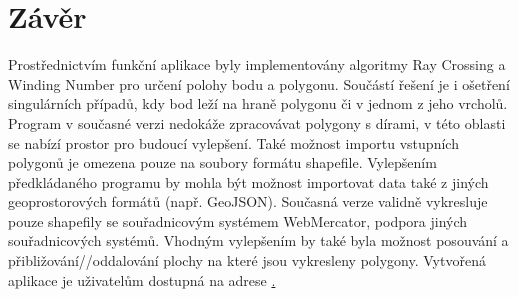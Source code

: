 \documentclass[a4paper,12pt]{article}
\begin{document}
\section{Závěr}
Prostřednictvím funkční aplikace byly implementovány algoritmy Ray Crossing a Winding Number pro určení polohy bodu a polygonu. Součástí řešení je i ošetření singulárních případů, kdy bod leží na hraně polygonu či v jednom z jeho vrcholů.
Program v současné verzi nedokáže zpracovávat polygony s dírami, v této oblasti se nabízí prostor pro budoucí vylepšení. Také možnost importu vstupních polygonů je omezena pouze na soubory formátu shapefile. Vylepšením předkládaného programu by mohla být možnost importovat data  také z jiných geoprostorových formátů (např. GeoJSON). Současná verze validně vykresluje pouze shapefily se souřadnicovým systémem WebMercator, podpora jiných souřadnicových systémů.
Vhodným vylepšením by také byla možnost posouvání a přibližování//oddalování plochy na které jsou vykresleny polygony.
Vytvořená aplikace je uživatelům dostupná na adrese \href{https://github.com/Omactek/task_1/tree/main}.

\printbibliography[title={Zdroje}]
\end{document}
